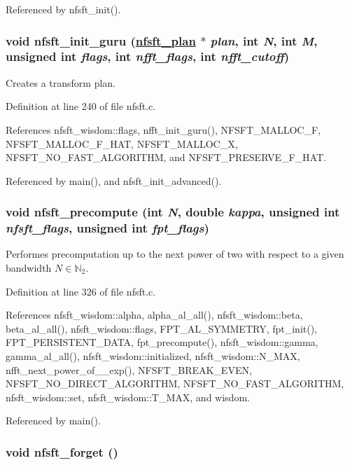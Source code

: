 Referenced by nfsft\_\-init().\hypertarget{group__nfsft_ga3}{
\subsubsection[nfsft\_\-init\_\-guru]{\setlength{\rightskip}{0pt plus 5cm}void nfsft\_\-init\_\-guru (\hyperlink{structnfsft__plan}{nfsft\_\-plan} $\ast$ {\em plan}, int {\em N}, int {\em M}, unsigned int {\em flags}, int {\em nfft\_\-flags}, int {\em nfft\_\-cutoff})}}
\label{group__nfsft_ga3}


Creates a transform plan. 



Definition at line 240 of file nfsft.c.

References nfsft\_\-wisdom::flags, nfft\_\-init\_\-guru(), NFSFT\_\-MALLOC\_\-F, NFSFT\_\-MALLOC\_\-F\_\-HAT, NFSFT\_\-MALLOC\_\-X, NFSFT\_\-NO\_\-FAST\_\-ALGORITHM, and NFSFT\_\-PRESERVE\_\-F\_\-HAT.

Referenced by main(), and nfsft\_\-init\_\-advanced().\hypertarget{group__nfsft_ga4}{
\subsubsection[nfsft\_\-precompute]{\setlength{\rightskip}{0pt plus 5cm}void nfsft\_\-precompute (int {\em N}, double {\em kappa}, unsigned int {\em nfsft\_\-flags}, unsigned int {\em fpt\_\-flags})}}
\label{group__nfsft_ga4}


Performes precomputation up to the next power of two with respect to a given bandwidth $N \in \mathbb{N}_2$. 



Definition at line 326 of file nfsft.c.

References nfsft\_\-wisdom::alpha, alpha\_\-al\_\-all(), nfsft\_\-wisdom::beta, beta\_\-al\_\-all(), nfsft\_\-wisdom::flags, FPT\_\-AL\_\-SYMMETRY, fpt\_\-init(), FPT\_\-PERSISTENT\_\-DATA, fpt\_\-precompute(), nfsft\_\-wisdom::gamma, gamma\_\-al\_\-all(), nfsft\_\-wisdom::initialized, nfsft\_\-wisdom::N\_\-MAX, nfft\_\-next\_\-power\_\-of\_\_\-exp(), NFSFT\_\-BREAK\_\-EVEN, NFSFT\_\-NO\_\-DIRECT\_\-ALGORITHM, NFSFT\_\-NO\_\-FAST\_\-ALGORITHM, nfsft\_\-wisdom::set, nfsft\_\-wisdom::T\_\-MAX, and wisdom.

Referenced by main().\hypertarget{group__nfsft_ga5}{
\subsubsection[nfsft\_\-forget]{\setlength{\rightskip}{0pt plus 5cm}void nfsft\_\-forget ()}}
\label{group__nfsft_ga5}


